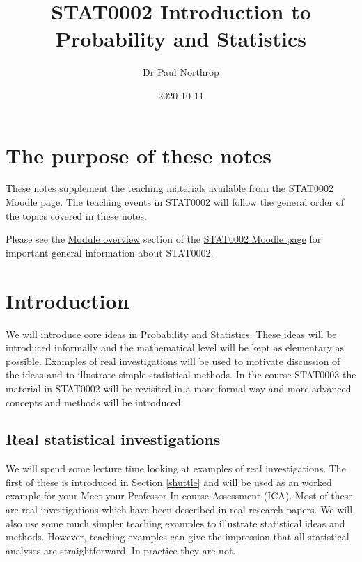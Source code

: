 \documentclass[
  11pt,
  british,
  openany, a4paper]{book}
\title{STAT0002 Introduction to Probability and Statistics}
\author{Dr Paul Northrop}
\date{2020-10-11}
\begin{document}
\maketitle

{
\setcounter{tocdepth}{1}
\tableofcontents
}
\hypertarget{the-purpose-of-these-notes}{%
\chapter*{The purpose of these notes}\label{the-purpose-of-these-notes}}

These notes supplement the teaching materials available from the \href{https://moodle.ucl.ac.uk/course/view.php?id=8579}{STAT0002 Moodle page}. The teaching events in STAT0002 will follow the general order of the topics covered in these notes.

Please see the \href{https://moodle.ucl.ac.uk/course/view.php?id=8579\&section=1}{Module overview} section of the \href{https://moodle.ucl.ac.uk/course/view.php?id=8579}{STAT0002 Moodle page} for important general information about STAT0002.

\hypertarget{introduction}{%
\chapter{Introduction}\label{introduction}}

We will introduce core ideas in Probability and Statistics. These ideas will be introduced informally and the mathematical level will be kept as elementary as possible. Examples of real investigations will be used to motivate discussion of the ideas and to illustrate simple statistical methods. In the course STAT0003 the material in STAT0002 will be revisited in a more formal way and more advanced concepts and methods will be introduced.

\hypertarget{real}{%
\section{Real statistical investigations}\label{real}}

We will spend some lecture time looking at examples of real investigations. The first of these is introduced in Section \ref{shuttle} and will be used as an worked example for your Meet your Professor In-course Assessment (ICA). Most of these are real investigations which have been described in real research papers. We will also use some much simpler teaching examples to illustrate statistical ideas and methods. However, teaching examples can give the impression that all statistical analyses are straightforward.
In practice they are not.
\end{document}
